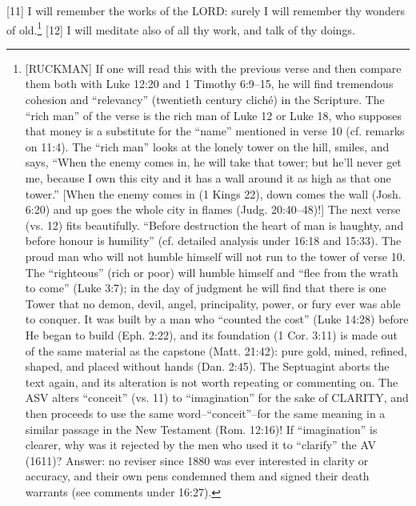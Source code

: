 [11] \textcolor[rgb]{0.00,0.00,1.00}{I will remember the works of the LORD: surely I will remember thy wonders of old.}\footnote{[RUCKMAN] If one will read this with the previous verse and then compare them both with Luke 12:20 and 1 Timothy 6:9--15, he will find tremendous cohesion and “relevancy” (twentieth century cliché) in the Scripture. The “rich man” of the verse is the rich man of Luke 12 or Luke 18, who supposes that money is a substitute for the “name” mentioned in verse 10 (cf. remarks on 11:4). The “rich man” looks at the lonely tower on the hill, smiles, and says, “When the enemy comes in, he will take that tower; but he’ll never get me, because I own this city and it has a wall around it as high as that one tower.” [When the enemy comes in (1 Kings 22), down comes the wall (Josh. 6:20) and up goes the whole city in flames (Judg. 20:40--48)!] The next verse (vs. 12) fits beautifully. “Before destruction the heart of man is haughty, and before honour is humility” (cf. detailed analysis under 16:18 and 15:33). The proud man who will not humble himself will not run to the tower of verse 10. The “righteous” (rich or poor) will humble himself and “flee from the wrath to come” (Luke 3:7); in the day of judgment he will find that there is one Tower that no demon, devil, angel, principality, power, or fury ever was able to conquer. It was built by a man who “counted the cost” (Luke 14:28) before He began to build (Eph. 2:22), and its foundation (1 Cor. 3:11) is made out of the same material as the capstone (Matt. 21:42): pure gold, mined, refined, shaped, and placed without hands (Dan. 2:45). The Septuagint aborts the text again, and its alteration is not worth repeating or commenting on. The ASV alters “conceit” (vs. 11) to “imagination” for the sake of CLARITY, and then proceeds to use the same word--“conceit”--for the same meaning in a similar passage in the New Testament (Rom. 12:16)! If “imagination” is clearer, why was it rejected by the men who used it to “clarify” the AV (1611)? Answer: no reviser since 1880 was ever interested in clarity or accuracy, and their own pens condemned them and signed their death warrants (see comments under 16:27).\cite{Ruckman1992Psalms}}
[12] \textcolor[rgb]{0.00,0.00,1.00}{I will meditate also of all thy work, and talk of thy doings.}
